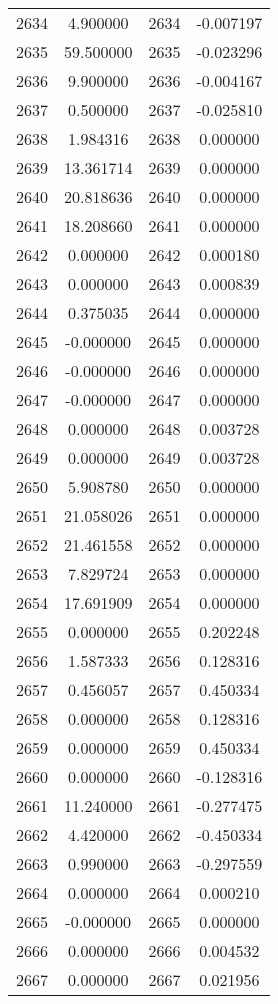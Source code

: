 \documentclass[12pt]{article}
\begin{document}
\begin{longtable}{@{}cccc@{}}
2634 & 4.900000 & 2634 & -0.007197 \\
2635 & 59.500000 & 2635 & -0.023296 \\
2636 & 9.900000 & 2636 & -0.004167 \\
2637 & 0.500000 & 2637 & -0.025810 \\
2638 & 1.984316 & 2638 & 0.000000 \\
2639 & 13.361714 & 2639 & 0.000000 \\
2640 & 20.818636 & 2640 & 0.000000 \\
2641 & 18.208660 & 2641 & 0.000000 \\
2642 & 0.000000 & 2642 & 0.000180 \\
2643 & 0.000000 & 2643 & 0.000839 \\
2644 & 0.375035 & 2644 & 0.000000 \\
2645 & -0.000000 & 2645 & 0.000000 \\
2646 & -0.000000 & 2646 & 0.000000 \\
2647 & -0.000000 & 2647 & 0.000000 \\
2648 & 0.000000 & 2648 & 0.003728 \\
2649 & 0.000000 & 2649 & 0.003728 \\
2650 & 5.908780 & 2650 & 0.000000 \\
2651 & 21.058026 & 2651 & 0.000000 \\
2652 & 21.461558 & 2652 & 0.000000 \\
2653 & 7.829724 & 2653 & 0.000000 \\
2654 & 17.691909 & 2654 & 0.000000 \\
2655 & 0.000000 & 2655 & 0.202248 \\
2656 & 1.587333 & 2656 & 0.128316 \\
2657 & 0.456057 & 2657 & 0.450334 \\
2658 & 0.000000 & 2658 & 0.128316 \\
2659 & 0.000000 & 2659 & 0.450334 \\
2660 & 0.000000 & 2660 & -0.128316 \\
2661 & 11.240000 & 2661 & -0.277475 \\
2662 & 4.420000 & 2662 & -0.450334 \\
2663 & 0.990000 & 2663 & -0.297559 \\
2664 & 0.000000 & 2664 & 0.000210 \\
2665 & -0.000000 & 2665 & 0.000000 \\
2666 & 0.000000 & 2666 & 0.004532 \\
2667 & 0.000000 & 2667 & 0.021956 \\

\end{longtable}
\end{document}
